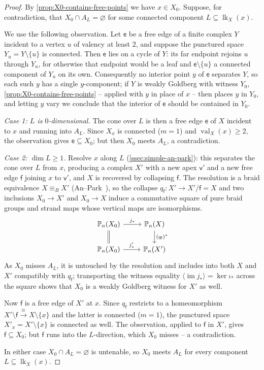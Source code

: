 \documentclass[reqno]{amsart}
\theoremstyle{definition}
\newcommand\sfe{\mathsf{e}}
\newcommand\sff{\mathsf{f}}
\newcommand\sfv{\mathsf{v}}
\newcommand{\PB}{\mathbb{P}}
\newcommand{\im}{\operatorname{im}}
\newcommand{\co}[1]{\mathopen{\langle}#1\mathclose{\rangle}} %
\DeclareMathOperator{\lk}{lk}
\DeclareMathOperator{\val}{val}
\numberwithin{equation}{section}
\begin{document}
\begin{proof}
By \cref{prop:X0-contains-free-points} we have \(x\in X_0\).
Suppose, for contradiction, that \(X_0\cap A_L=\varnothing\)
for some connected component \(L\subseteq\lk_X(x)\).

We use the following observation. Let \(\sfe\) be a free edge of a
finite complex \(Y\) incident to a vertex \(u\) of valency at least
\(2\), and suppose the punctured space \(Y_u=Y\setminus\{u\}\) is
connected. Then \(\sfe\) lies on a cycle of \(Y\): its far endpoint
rejoins \(u\) through \(Y_u\), for otherwise that endpoint would be
a leaf and \(\sfe\setminus\{u\}\) a connected component of \(Y_u\) on
its own. Consequently no interior point \(y\) of \(\sfe\) separates
\(Y\), so each such \(y\) has a single \(y\)-component; if \(Y\) is
weakly Goldberg with witness \(Y_0\),
\cref{prop:X0-contains-free-points} -- applied with \(y\) in place
of \(x\) -- then places \(y\) in \(Y_0\), and letting \(y\) vary we
conclude that the interior of \(\sfe\) should be contained in \(Y_0\).

\emph{Case 1: \(L\) is \(0\)-dimensional.} The cone over \(L\)
is then a free edge \(\sfe\) of \(X\) incident to \(x\) and running
into \(A_L\). Since \(X_x\) is connected (\(m=1\)) and
\(\val_X(x)\geq 2\), the observation gives \(\sfe\subseteq X_0\); but
then \(X_0\) meets \(A_L\), a contradiction.

\emph{Case 2: \(\dim L\geq 1\).} Resolve \(x\) along \(L\)
(\cref{ssec:simple-an-park}): this separates the cone over \(L\)
from \(x\), producing a complex \(X'\) with a new apex \(\sfv'\) and a
new free edge \(\sff\) joining \(x\) to \(\sfv'\), and \(X\) is recovered
by collapsing \(\sff\). The resolution is a braid equivalence
\(X\equiv_B X'\) (An--Park~\cite[Prop.~3.11]{AnPark2017}), so the
collapse \(q_\sff\colon X'\to X'/\sff=X\) and two inclusions \(X_0\to X'\) and \(X_0\to X\) induce a commutative square of
pure braid groups and strand maps whose vertical maps
are isomorphisms. 
\[
\begin{tikzcd}
\PB_n(X_0) \ar[r,"j_*"] \ar[d,equal] & \PB_n(X) \ar[d,"(q_\sff)^*"]\\ %
\PB_n(X_0) \ar[r,"j'_*"] & \PB_n(X') %
\end{tikzcd}
\]
As \(X_0\) misses \(A_L\), it is untouched by the resolution and includes into both \(X\) and
\(X'\) compatibly with \(q_\sff\); transporting the witness equality
\(\co{\im j_\ast}=\ker\iota_\ast\) across the square shows that
\(X_0\) is a weakly Goldberg witness for \(X'\) as well.

Now \(\sff\) is a free edge of \(X'\) at \(x\). Since \(q_\sff\)
restricts to a homeomorphism
\(X'\setminus \sff\xrightarrow\cong X\setminus\{x\}\) and the
latter is connected (\(m=1\)), the punctured space
\(X'_x=X'\setminus\{x\}\) is connected as well. The observation,
applied to \(\sff\) in \(X'\), gives \(\sff\subseteq X_0\); but \(\sff\) runs
into the \(L\)-direction, which \(X_0\) misses -- a contradiction.

In either case \(X_0\cap A_L=\varnothing\) is untenable, so
\(X_0\) meets \(A_L\) for every component \(L\subseteq\lk_X(x)\).
\end{proof}
\end{document}
